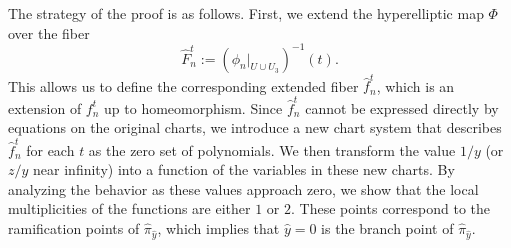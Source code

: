 \documentclass[10pt,a4paper,reqno]{amsart}
\theoremstyle{definition}
\numberwithin{equation}{section}
\numberwithin{figure}{section}
\begin{document}
The strategy of the proof is as follows. 
First, we extend the hyperelliptic map $\Phi$ over the fiber \[\hat{F}_n^t:=(\phi_n |_{U\cup U_{3}})^{-1}(t).\] 
This allows us to define the corresponding extended fiber $\hat{f}_n^t$, which is an extension of $f_n^t$ up to homeomorphism.
Since $\hat{f}_n^t$ cannot be expressed directly by equations on the original charts, 
we introduce a new chart system that describes $\hat{f}_n^t$ for each $t$ as the zero set of polynomials.
We then transform the value $1/y$ (or $z/y$ near infinity) into a function of the variables in these new charts.
By analyzing the behavior as these values approach zero, we show that the local multiplicities of the functions are either $1$ or $2$.
These points correspond to the ramification points of $\hat{\pi}_{\hat{y}}$, 
which implies that $\hat{y}=0$ is the branch point of $\hat{\pi}_{\hat{y}}$.
\end{document}

